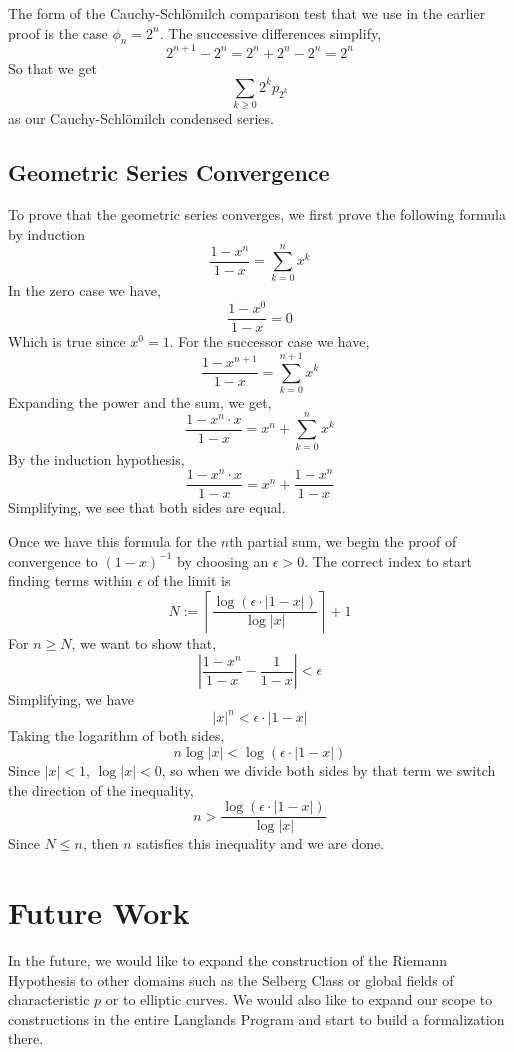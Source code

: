 \documentclass[12pt,reqno]{amsart}
\numberwithin{equation}{section}
\begin{document}
The form of the Cauchy-Schl\"omilch comparison test that we use in the earlier proof is the case $\phi_n = 2^n$. The successive differences simplify,
\[
    2^{n+1} - 2^n = 2^n + 2^n - 2^n = 2^n
\]
So that we get
\[
    \sum_{k\geq0}2^k p_{2^k}
\]
as our Cauchy-Schl\"omilch condensed series.

\subsection{Geometric Series Convergence}

To prove that the geometric series converges, we first prove the following formula by induction 
\[
    \frac{1 - x ^ n}{1 - x} = \sum_{k=0}^n x^k
\]
In the zero case we have,
\[
    \frac{1 - x ^ 0}{1 - x} = 0
\]
Which is true since $x ^ 0 = 1$. For the successor case we have,
\[
    \frac{1 - x ^ {n+1}}{1 - x} = \sum_{k=0}^{n+1} x ^ k
\]
Expanding the power and the sum, we get,
\[
    \frac{1 - x ^ n \cdot x}{1 - x} = x ^ n + \sum_{k=0}^n x ^ k
\]
By the induction hypothesis,
\[
    \frac{1 - x ^ n \cdot x}{1 - x} = x ^ n + \frac{1 - x ^ n}{1 - x}
\]
Simplifying, we see that both sides are equal.

Once we have this formula for the $n$th partial sum, we begin the proof of convergence to $(1 - x)^{-1}$ by choosing an $\epsilon > 0$. The correct index to start finding terms within $\epsilon$ of the limit is
\[
    N := \left \lceil{\frac{\log(\epsilon\cdot|1 - x|)}{\log|x|}}\right \rceil + 1
\]
For $n \geq N$, we want to show that,
\[
    \left| \frac{1 - x ^ n}{1 - x} - \frac{1}{1 - x}\right| < \epsilon
\]
Simplifying, we have
\[
    |x|^n < \epsilon \cdot |1 - x|
\]
Taking the logarithm of both sides,
\[
    n\log|x| < \log(\epsilon\cdot|1 - x|)
\]
Since $|x| < 1$, $\log|x| < 0$, so when we divide both sides by that term we switch the direction of the inequality,
\[
    n > \frac{\log(\epsilon\cdot|1-x|)}{\log|x|}
\]
Since $N \leq n$, then $n$ satisfies this inequality and we are done.

\section{Future Work}

In the future, we would like to expand the construction of the Riemann Hypothesis to other domains such as the Selberg Class or global fields of characteristic $p$ or to elliptic curves. We would also like to expand our scope to constructions in the entire Langlands Program and start to build a formalization there.

\newpage




\end{document}
